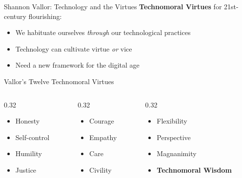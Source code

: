 ﻿\documentclass[aspectratio=169,11pt]{beamer}
\begin{document}
\begin{frame}{Shannon Vallor: Technology and the Virtues}
\textbf{Technomoral Virtues} for 21st-century flourishing:

\begin{itemize}
    \item We habituate ourselves \textit{through} our technological practices
    \item Technology can cultivate virtue \textit{or} vice
    \item Need a new framework for the digital age
\end{itemize}

\vspace{0.2cm}
\begin{block}{Vallor's Twelve Technomoral Virtues}
\begin{columns}[T]
\begin{column}{0.32\textwidth}
\small
\begin{itemize}
    \item Honesty
    \item Self-control
    \item Humility
    \item Justice
\end{itemize}
\end{column}
\begin{column}{0.32\textwidth}
\small
\begin{itemize}
    \item Courage
    \item Empathy
    \item Care
    \item Civility
\end{itemize}
\end{column}
\begin{column}{0.32\textwidth}
\small
\begin{itemize}
    \item Flexibility
    \item Perspective
    \item Magnanimity
    \item \textbf{Technomoral Wisdom}
\end{itemize}
\end{column}
\end{columns}
\end{block}
\end{frame}

\end{document}
